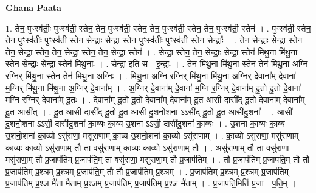 \documentclass[17pt]{extarticle}
\begin{document}
\textbf{Ghana Paata } \newline

1. तेन॒ पुꣳस्व॑तीः॒ पुꣳस्व॑ती॒ स्तेन॒ तेन॒ पुꣳस्व॑ती॒ स्तेन॒ तेन॒ पुꣳस्व॑ती॒ स्तेन॒ तेन॒ पुꣳस्व॑ती॒ स्तेन॑ । . पुꣳस्व॑ती॒ स्तेन॒ तेन॒ पुꣳस्व॑तीः॒ पुꣳस्व॑ती॒ स्तेन॒ सेन्द्राः॒ सेन्द्रा॒ स्तेन॒ पुꣳस्व॑तीः॒ पुꣳस्व॑ती॒ स्तेन॒ सेन्द्राः᳚ । . तेन॒ सेन्द्राः॒ सेन्द्रा॒ स्तेन॒ तेन॒ सेन्द्रा॒ स्तेन॒ तेन॒ सेन्द्रा॒ स्तेन॒ तेन॒ सेन्द्रा॒ स्तेन॑ । . सेन्द्रा॒ स्तेन॒ तेन॒ सेन्द्राः॒ सेन्द्रा॒ स्तेन॑ मिथु॒ना मि॑थु॒ना स्तेन॒ सेन्द्राः॒ सेन्द्रा॒ स्तेन॑ मिथु॒नाः । . सेन्द्रा॒ इति॒ स - इ॒न्द्राः॒ । . तेन॑ मिथु॒ना मि॑थु॒ना स्तेन॒ तेन॑ मिथु॒ना अ॒ग्नि र॒ग्निर् मि॑थु॒ना स्तेन॒ तेन॑ मिथु॒ना अ॒ग्निः । . मि॒थु॒ना अ॒ग्नि र॒ग्निर् मि॑थु॒ना मि॑थु॒ना अ॒ग्निर् दे॒वाना᳚म् दे॒वाना॑ म॒ग्निर् मि॑थु॒ना मि॑थु॒ना अ॒ग्निर् दे॒वाना᳚म् । . अ॒ग्निर् दे॒वाना᳚म् दे॒वाना॑ म॒ग्नि र॒ग्निर् दे॒वाना᳚म् दू॒तो दू॒तो दे॒वाना॑ म॒ग्नि र॒ग्निर् दे॒वाना᳚म् दू॒तः । . दे॒वाना᳚म् दू॒तो दू॒तो दे॒वाना᳚म् दे॒वाना᳚म् दू॒त आसी॒ दासी᳚द् दू॒तो दे॒वाना᳚म् दे॒वाना᳚म् दू॒त आसी᳚त् । . दू॒त आसी॒ दासी᳚द् दू॒तो दू॒त आसी॑ दु॒शनो॒शना ऽऽसी᳚द् दू॒तो दू॒त आसी॑दु॒शना᳚ । . आसी॑ दु॒शनो॒शना ऽऽसी॒ दासी॑दु॒शना॑ का॒व्यः का॒व्य उ॒शना ऽऽसी॒ दासी॑दु॒शना॑ का॒व्यः । . उ॒शना॑ का॒व्यः का॒व्य उ॒शनो॒शना॑ का॒व्यो ऽसु॑राणा॒ मसु॑राणाम् का॒व्य उ॒शनो॒शना॑ का॒व्यो ऽसु॑राणाम् । . का॒व्यो ऽसु॑राणा॒ मसु॑राणाम् का॒व्यः का॒व्यो ऽसु॑राणा॒म् तौ ता वसु॑राणाम् का॒व्यः का॒व्यो ऽसु॑राणा॒म् तौ । . असु॑राणा॒म् तौ ता वसु॑राणा॒ मसु॑राणा॒म् तौ प्र॒जाप॑तिम् प्र॒जाप॑ति॒म् ता वसु॑राणा॒ मसु॑राणा॒म् तौ प्र॒जाप॑तिम् । . तौ प्र॒जाप॑तिम् प्र॒जाप॑ति॒म् तौ तौ प्र॒जाप॑तिम् प्र॒श्ञम् प्र॒श्ञम् प्र॒जाप॑ति॒म् तौ तौ प्र॒जाप॑तिम् प्र॒श्ञम् । . प्र॒जाप॑तिम् प्र॒श्ञम् प्र॒श्ञम् प्र॒जाप॑तिम् प्र॒जाप॑तिम् प्र॒श्ञ मै॑ता मैताम् प्र॒श्ञम् प्र॒जाप॑तिम् प्र॒जाप॑तिम् प्र॒श्ञ मै॑ताम् । . प्र॒जाप॑ति॒मिति॑ प्र॒जा - प॒ति॒म् । \newline
\end{document}
